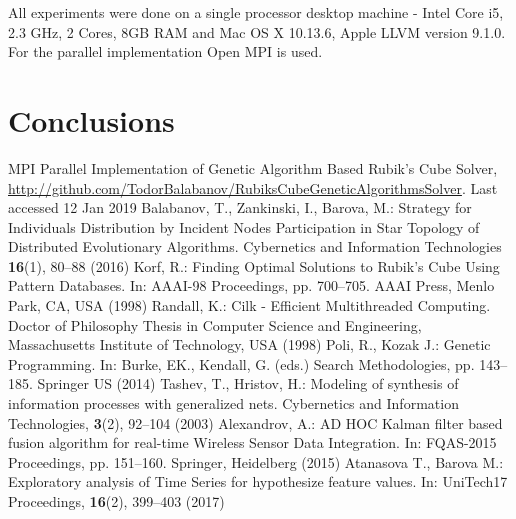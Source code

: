 \documentclass[runningheads]{llncs}
\begin{document}
All experiments were done on a single processor desktop machine - Intel Core i5, 2.3 GHz, 2 Cores, 8GB RAM and Mac OS X 10.13.6, Apple LLVM version 9.1.0. For the parallel implementation Open MPI is used.

\section{Conclusions}

\cite{tashev01}

\cite{alexandrov01}

\cite{atanasova01}

\begin{thebibliography}{8}
MPI Parallel Implementation of Genetic Algorithm Based Rubik’s Cube Solver, \url{http://github.com/TodorBalabanov/RubiksCubeGeneticAlgorithmsSolver}. Last accessed 12 Jan 2019
Balabanov, T., Zankinski, I., Barova, M.: Strategy for Individuals Distribution by Incident Nodes Participation in Star Topology of Distributed Evolutionary Algorithms. Cybernetics and Information Technologies \textbf{16}(1), 80--88 (2016)
Korf, R.: Finding Optimal Solutions to Rubik’s Cube Using Pattern Databases. In: AAAI-98 Proceedings, pp. 700--705. AAAI Press, Menlo Park, CA, USA (1998)
Randall, K.: Cilk - Efficient Multithreaded Computing. Doctor of Philosophy Thesis in Computer Science and Engineering, Massachusetts Institute of Technology, USA (1998) 
Poli, R., Kozak J.: Genetic Programming. In: Burke, EK., Kendall, G. (eds.) Search Methodologies, pp. 143--185. Springer US (2014)
Tashev, T., Hristov, H.: Modeling of synthesis of information processes with generalized nets. Cybernetics and Information Technologies, \textbf{3}(2), 92--104 (2003) 
Alexandrov, A.: AD HOC Kalman filter based fusion algorithm for real-time Wireless Sensor Data Integration. In: FQAS-2015 Proceedings, pp. 151--160. Springer, Heidelberg (2015)
Atanasova T., Barova M.: Exploratory analysis of Time Series for hypothesize feature values. In: UniTech17 Proceedings,  \textbf{16}(2), 399--403 (2017)
\end{thebibliography}
\end{document}
